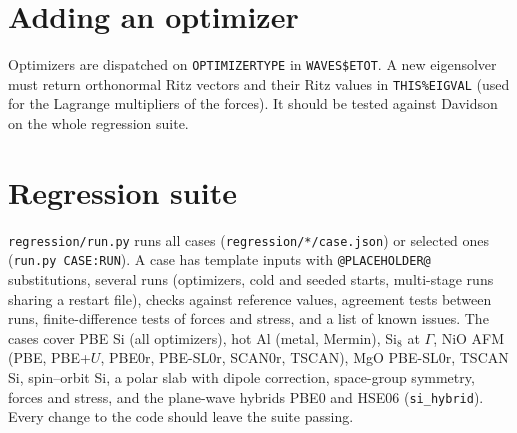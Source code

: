 \documentclass[11pt,a4paper,oneside]{book}
\newcommand{\pbezero}{PBE0r}
\newcommand{\scanzero}{SCAN0r}
\newcommand{\pbeslzero}{PBE-SL0r}
\begin{document}
\section{Adding an optimizer}

Optimizers are dispatched on \texttt{OPTIMIZERTYPE} in \texttt{WAVES\$ETOT}.
A new eigensolver must return orthonormal Ritz vectors and their Ritz
values in \texttt{THIS\%EIGVAL} (used for the Lagrange multipliers of the
forces). It should be tested against Davidson on the whole regression
suite.

\section{Regression suite}

\texttt{regression/run.py} runs all cases (\texttt{regression/*/case.json})
or selected ones (\texttt{run.py CASE:RUN}). A case has template inputs
with \texttt{@PLACEHOLDER@} substitutions, several runs (optimizers,
cold and seeded starts, multi-stage runs sharing a restart file), checks
against reference values, agreement tests between runs, finite-difference
tests of forces and stress, and a list of known issues. The cases cover
PBE Si (all optimizers), hot Al (metal, Mermin), Si$_8$ at $\Gamma$, NiO
AFM (PBE, PBE+$U$, \pbezero, \pbeslzero, \scanzero, TSCAN), MgO
\pbeslzero, TSCAN Si, spin--orbit Si, a polar slab with dipole
correction, space-group symmetry, forces and stress, and the plane-wave
hybrids PBE0 and HSE06 (\texttt{si\_hybrid}). Every change to the code should leave the suite passing.

\backmatter


\end{document}
